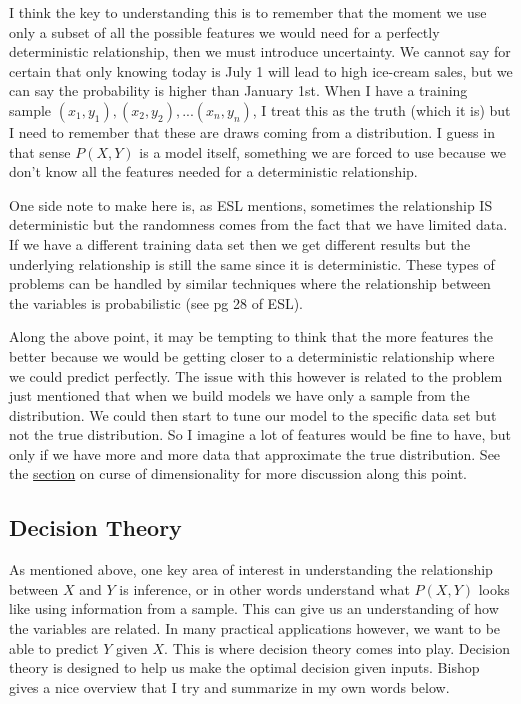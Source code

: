 I think the key to understanding this is to remember that the moment we use only a subset of all the possible features we would need for a perfectly deterministic relationship, then we must introduce uncertainty. We cannot say for certain that only knowing today is July 1 will lead to high ice-cream sales, but we can say the probability is higher than January 1st. When I have a training sample $(x_1, y_1), (x_2, y_2), ... (x_n, y_n)$,  I treat this as the truth (which it is) but I need to remember that these are draws coming from a distribution. I guess in that sense $P(X,Y)$ is a model itself, something we are forced to use because we don't know all the features needed for a deterministic relationship. 

One side note to make here is, as ESL mentions, sometimes the relationship IS deterministic but the randomness comes from the fact that we have limited data. If we have a different training data set then we get different results but the underlying relationship is still the same since it is deterministic. These types of problems can be handled by similar techniques where the relationship between the variables is probabilistic (see pg 28 of ESL).

Along the above point, it may be tempting to think that the more features the better because we would be getting closer to a deterministic relationship where we could predict perfectly. The issue with this however is related to the problem just mentioned that when we build models we have only a sample from the distribution. We could then start to tune our model to the specific data set but not the true distribution. So I imagine a lot of features would be fine to have, but only if we have more and more data that approximate the true distribution. See the \hyperref[sec:curse]{section} on curse of dimensionality for more discussion along this point.

\subsection{Decision Theory}
As mentioned above, one key area of interest in understanding the relationship between $X$ and $Y$ is inference, or in other words understand what $P(X,Y)$ looks like using information from a sample.  This can give us an understanding of how the variables are related. In many practical applications however, we want to be able to predict $Y$ given $X$. This is where decision theory comes into play. Decision theory is designed to help us make the optimal decision given inputs. Bishop gives a nice overview that I try and summarize in my own words below.

